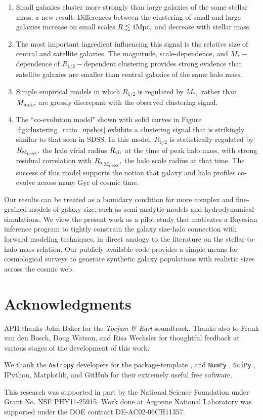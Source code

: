 \documentclass[usenatbib,usegraphicx,letterpaper]{mn2e}
\newcommand{\ben}{\begin{enumerate}}
\newcommand{\een}{\end{enumerate}}
\newcommand{\rhalf}{R_{1/2}}
\newcommand{\mstar}{M_{\ast}}
\newcommand{\mhalo}{M_{\rm halo}}
\newcommand{\rvir}{R_{\rm vir}}
\newcommand{\rmpeak}{R_{\rm M_{peak}}}
\newcommand{\rspeak}{{R_{\rm s,}}_{\rm M_{peak}}}
\newcommand{\mpc}{{\rm Mpc}}
\begin{document}
\ben
\item Small galaxies cluster more strongly than large galaxies of the same stellar mass, a new result. Differences between the clustering of small and large galaxies increase on small scales $R\lesssim1\mpc,$ and decrease with stellar mass.
\item The most important ingredient influencing this signal is the relative size of central and satellite galaxies. The magnitude, scale-dependence, and $\mstar-$dependence of $\rhalf-$dependent clustering provides strong evidence that satellite galaxies are smaller than central galaxies of the same halo mass.
\item Simple empirical models in which $\rhalf$ is regulated by $\mstar,$ rather than $\mhalo,$ are grossly discrepant with the observed clustering signal.
\item The ``co-evolution model" shown with solid curves in Figure \ref{fig:clustering_ratio_upshot} exhibits a clustering signal that is strikingly similar to that seen in SDSS. In this model, $\rhalf$ is statistically regulated by $\rmpeak,$ the halo virial radius $\rvir$ at the time of peak halo mass, with strong residual correlation with $\rspeak,$ the halo scale radius at that time. The success of this model supports the notion that galaxy and halo profiles co-evolve across many Gyr of cosmic time.
\een

Our results can be treated as a boundary condition for more complex and fine-grained models of galaxy size, such as semi-analytic models and hydrodynamical simulations. We view the present work as a pilot study that motivates a Bayesian inference program to tightly constrain the galaxy size-halo connection with forward modeling techniques, in direct analogy to the literature on the stellar-to-halo-mass relation. Our publicly available code provides a simple means for cosmological surveys to generate synthetic galaxy populations with realistic sizes across the cosmic web.

\section*{Acknowledgments}

APH thanks John Baker for the {\em Toejam \& Earl} soundtrack. Thanks also to Frank van den Bosch, Doug Watson, and Risa Wechsler for thoughtful feedback at various stages of the development of this work.

We thank the {\tt Astropy} developers for the package-template \citep{astropy}, and {\tt NumPy} \citep{numpy_ndarray}, {\tt SciPy} \citep{scipy}, IPython, Matplotlib, and GitHub for their extremely useful free software.

This research was supported in part by the National Science Foundation under Grant No. NSF PHY11-25915. Work done at Argonne National Laboratory was supported under the DOE contract DE-AC02-06CH11357.


\end{document}
